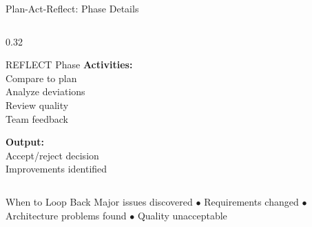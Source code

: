 \documentclass[aspectratio=169,10pt]{beamer}
\begin{document}
\begin{frame}{Plan-Act-Reflect: Phase Details}
\begin{columns}[T]
\begin{column}{0.32\textwidth}
\begin{block}{REFLECT Phase}
                \textbf{Activities:}\\
                Compare to plan\\
                Analyze deviations\\
                Review quality\\
                Team feedback

                \textbf{Output:}\\
                Accept/reject decision\\
                Improvements identified
            \end{block}
        \end{column}
    \end{columns}
    \vspace{0.3cm}
    \begin{alertblock}{When to Loop Back}
        Major issues discovered $\bullet$ Requirements changed $\bullet$ Architecture problems found $\bullet$ Quality unacceptable
    \end{alertblock}

\end{frame}
\end{document}
